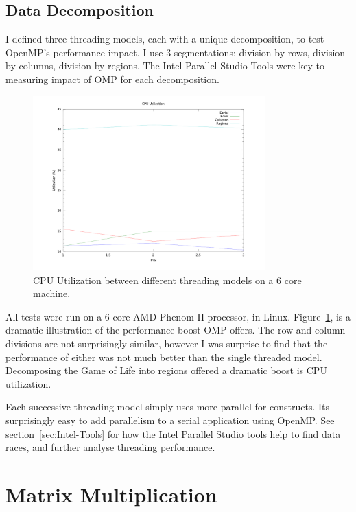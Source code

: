 \documentclass[10pt]{article}
\begin{document}
\subsection{Data Decomposition}
I defined three threading models, each with a unique decomposition, to test OpenMP's performance impact.
I use 3 segmentations: division by rows, division by columns, 
division by regions.  The Intel Parallel Studio Tools were key to measuring impact of OMP
for each decomposition. 

\begin{figure}[!h]
\begin{center}
\includegraphics[width=0.8\textwidth]{figures/utilization_compared.png}
\caption{CPU Utilization between different threading models on a 6 core machine.}
\label{fig:gol_cpu_utilization}
\end{center}
\end{figure}

All tests were run on a 6-core AMD Phenom II processor, in Linux. Figure~\ref{fig:gol_cpu_utilization},
is a dramatic illustration of the performance boost OMP offers.  The row and column divisions are not 
surprisingly similar, however I was surprise to find that the performance of either was not much better 
than the single threaded model.  Decomposing the Game of Life into regions offered a dramatic
boost is CPU utilization.

Each successive threading model simply uses more parallel-for constructs.  Its surprisingly easy
to add parallelism to a serial application using OpenMP.  See section~\ref{sec:Intel-Tools} for how the 
Intel Parallel Studio tools help to find data races, and further analyse threading performance.

\section{Matrix Multiplication}
\end{document}
